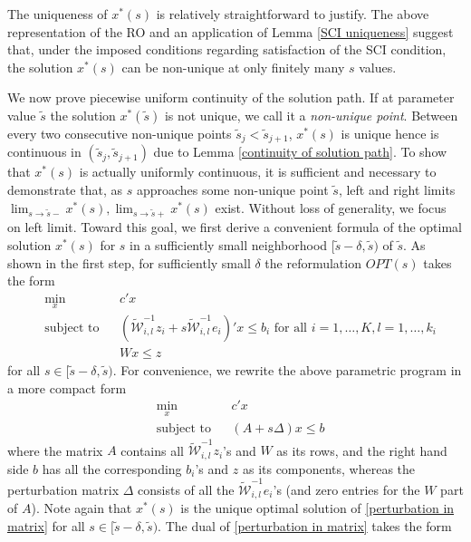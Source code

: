 \documentclass[mnsc,blindrev]{informs4} %
\begin{document}
The uniqueness of $x^*(s)$ is relatively straightforward to justify. The above representation of the RO and an application of Lemma \ref{SCI uniqueness} suggest that, under the imposed conditions regarding satisfaction of the SCI condition, the solution $x^*(s)$ can be non-unique at only finitely many $s$ values.

We now prove piecewise uniform continuity of the solution path. If at parameter value $\tilde s$ the solution $x^*(\tilde s)$ is not unique, we call it a \textit{non-unique point}. Between every two consecutive non-unique points $\tilde s_j<\tilde s_{j+1}$, $x^*(s)$ is unique hence is continuous in $(\tilde s_j,\tilde s_{j+1})$ due to Lemma \ref{continuity of solution path}. To show that $x^*(s)$ is actually uniformly continuous, it is sufficient and necessary to demonstrate that, as $s$ approaches some non-unique point $\tilde s$, left and right limits $\lim_{s\to \tilde s-}x^*(s),\lim_{s\to \tilde s+}x^*(s)$ exist. Without loss of generality, we focus on left limit. Toward this goal, we first derive a convenient formula of the optimal solution $x^*(s)$ for $s$ in a sufficiently small neighborhood $[\tilde s-\delta,\tilde s)$ of $\tilde s$. As shown in the first step, for sufficiently small $\delta$ the reformulation $OPT(s)$ takes the form
\begin{equation*}
\begin{aligned}
    &\min_x&&c'x\\
    &\text{subject to}&&(\widetilde{\mathcal W}_{i,l}^{-1}z_i+s\widetilde{\mathcal W}_{i,l}^{-1}e_i)'x\leq b_i\text{ for all }i=1,\ldots,K,l=1,\ldots,k_i\\
    &&&Wx\leq z
\end{aligned}
\end{equation*}
for all $s\in [\tilde s-\delta,\tilde s)$. For convenience, we rewrite the above parametric program in a more compact form
\begin{equation}\label{perturbation in matrix}
\begin{aligned}
    &\min_x&&c'x\\
    &\text{subject to}&&(A+s\Delta)x\leq b
\end{aligned}
\end{equation}
where the matrix $A$ contains all $\widetilde{\mathcal W}_{i,l}^{-1}z_i$'s and $W$ as its rows, and the right hand side $b$ has all the corresponding $b_i$'s and $z$ as its components, whereas the perturbation matrix $\Delta$ consists of all the $\widetilde{\mathcal W}_{i,l}^{-1}e_i$'s (and zero entries for the $W$ part of $A$). Note again that $x^*(s)$ is the unique optimal solution of \eqref{perturbation in matrix} for all $s\in[\tilde s-\delta,\tilde s)$. The dual of \eqref{perturbation in matrix} takes the form
\end{document}
